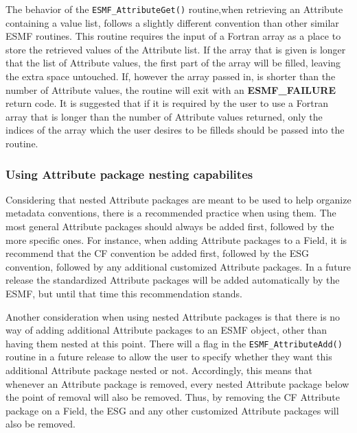 The behavior of the {\tt ESMF\_AttributeGet()} routine,when retrieving an Attribute containing a value list, follows a slightly different convention than other similar ESMF routines.  This routine requires the input of a Fortran array as a place to store the retrieved values of the Attribute list.  If the array that is given is longer that the list of Attribute values, the first part of the array will be filled, leaving the extra space untouched.  If, however the array passed in, is shorter than the number of Attribute values, the routine will exit with an {\bf ESMF\_FAILURE} return code.  It is suggested that if it is required by the user to use a Fortran array that is longer than the number of Attribute values returned, only the indices of the array which the user desires to be filleds should be passed into the routine.  
  
\subsubsection{Using Attribute package nesting capabilites}

Considering that nested Attribute packages are meant to be used to help organize metadata conventions, there is a recommended practice when using them.  The most general Attribute packages should always be added first, followed by the more specific ones.  For instance, when adding Attribute packages to a Field, it is recommend that the CF convention be added first, followed by the ESG convention, followed by any additional customized Attribute packages.  In a future release the standardized Attribute packages will be added automatically by the ESMF, but until that time this recommendation stands.

Another consideration when using nested Attribute packages is that there is no way of adding additional Attribute packages to an ESMF object, other than having them nested at this point.  There will a flag in the {\tt ESMF\_AttributeAdd()} routine in a future release to allow the user to specify whether they want this additional Attribute package nested or not.  Accordingly, this means that whenever an Attribute package is removed, every nested Attribute package below the point of removal will also be removed.  Thus, by removing the CF Attribute package on a Field, the ESG and any other customized Attribute packages will also be removed.








